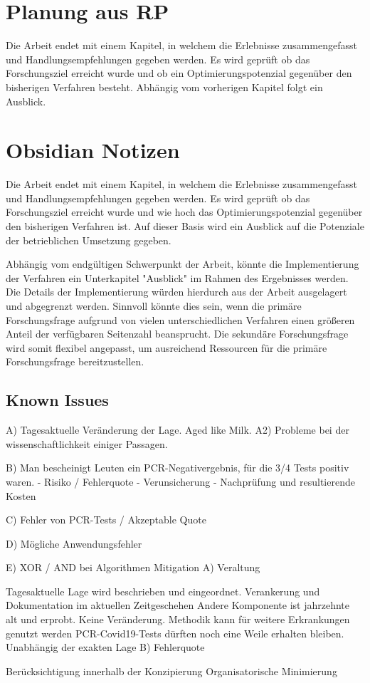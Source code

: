 \section{Planung aus RP}
Die Arbeit endet mit einem Kapitel, in welchem die Erlebnisse zusammengefasst und Handlungsempfehlungen gegeben werden.
Es wird geprüft ob das Forschungsziel erreicht wurde und ob ein Optimierungspotenzial gegenüber den bisherigen Verfahren besteht.
Abhängig vom vorherigen Kapitel folgt ein Ausblick.

\section{Obsidian Notizen}
Die Arbeit endet mit einem Kapitel, in welchem die Erlebnisse zusammengefasst und Handlungsempfehlungen gegeben werden.
Es wird geprüft ob das Forschungsziel erreicht wurde und wie hoch das Optimierungspotenzial gegenüber den bisherigen Verfahren ist.
Auf dieser Basis wird ein Ausblick auf die Potenziale der betrieblichen Umsetzung gegeben.

Abhängig vom endgültigen Schwerpunkt der Arbeit, könnte die Implementierung der Verfahren ein Unterkapitel "Ausblick" im Rahmen des Ergebnisses werden.
Die Details der Implementierung würden hierdurch aus der Arbeit ausgelagert und abgegrenzt werden.
Sinnvoll könnte dies sein, wenn die primäre Forschungsfrage aufgrund von vielen unterschiedlichen Verfahren einen größeren Anteil der verfügbaren Seitenzahl beansprucht.
Die sekundäre Forschungsfrage wird somit flexibel angepasst, um ausreichend Ressourcen für die primäre Forschungsfrage bereitzustellen.

\subsection{Known Issues}
A) Tagesaktuelle Veränderung der Lage. Aged like Milk.
A2) Probleme bei der wissenschaftlichkeit einiger Passagen.

B) Man bescheinigt Leuten ein PCR-Negativergebnis, für die 3/4 Tests positiv waren.
- Risiko / Fehlerquote
- Verunsicherung
- Nachprüfung und resultierende Kosten

C) Fehler von PCR-Tests / Akzeptable Quote

D) Mögliche Anwendungsfehler

E) XOR / AND bei Algorithmen
Mitigation
A) Veraltung

Tagesaktuelle Lage wird beschrieben und eingeordnet.
Verankerung und Dokumentation im aktuellen Zeitgeschehen
Andere Komponente ist jahrzehnte alt und erprobt. Keine Veränderung.
Methodik kann für weitere Erkrankungen genutzt werden
PCR-Covid19-Tests dürften noch eine Weile erhalten bleiben. Unabhängig der exakten Lage
B) Fehlerquote

Berücksichtigung innerhalb der Konzipierung
Organisatorische Minimierung
\fi

